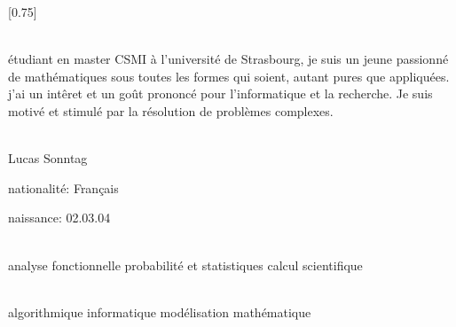 \documentclass[verylight]{simplehipstercv}
\begin{document}
\setlength{\columnsep}{1.5cm}
[0.75]
\begin{paracol}{2}

\paracolbackgroundoptions



\footnotesize
{\setasidefontcolour
\flushright
\begin{center}
\end{center}

\\[0.5em]

{\footnotesize
étudiant en master CSMI à l'université de Strasbourg,
je suis un jeune passionné de mathématiques sous toutes les formes qui soient, autant pures que appliquées. j'ai un intêret et un goût prononcé pour l'informatique et la recherche.
Je suis motivé et stimulé par la résolution de problèmes complexes.}
\bigskip

 \\[0.5em]
Lucas Sonntag   

nationalité: Français 

naissance: 02.03.04

\bigskip

 \\[0.5em]

analyse fonctionnelle
probabilité et statistiques
calcul scientifique


\bigskip



\bigskip

\\[0.5em]

algorithmique
informatique
modélisation mathématique


\bigskip


\vspace{4em}


\phantom{turn the page}


}
\switchcolumn

\small


\end{paracol}
\end{document}
